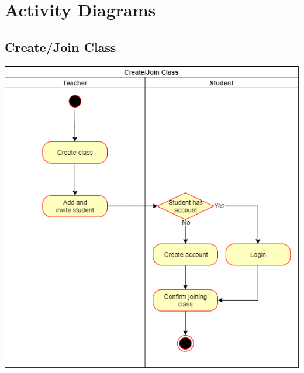 \documentclass[12pt]{article}
\begin{document}
\begin{titlepage}
    \maketitle
    \thispagestyle{firstpage}
\end{titlepage}

\section{Activity Diagrams}
    \subsection{Create/Join Class}
    \begin{center}\includegraphics[width=\textwidth]{images/CreateJoinClass.png}\end{center}
\end{document}
